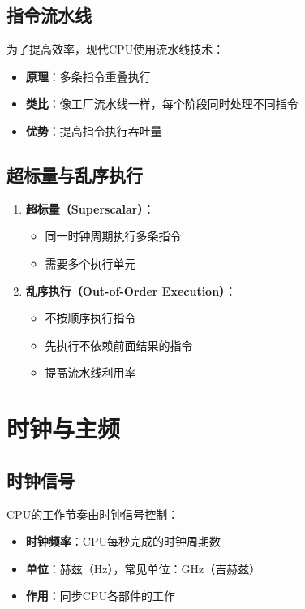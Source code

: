 \documentclass[12pt,UTF8]{ctexbook}
\begin{document}
\section{指令流水线}

为了提高效率，现代CPU使用流水线技术：

\begin{itemize}[leftmargin=2em]
    \item \textbf{原理}：多条指令重叠执行
    \item \textbf{类比}：像工厂流水线一样，每个阶段同时处理不同指令
    \item \textbf{优势}：提高指令执行吞吐量
\end{itemize}

\section{超标量与乱序执行}

\begin{enumerate}
    \item \textbf{超标量（Superscalar）}：
    \begin{itemize}[leftmargin=2em]
        \item 同一时钟周期执行多条指令
        \item 需要多个执行单元
    \end{itemize}
    
    \item \textbf{乱序执行（Out-of-Order Execution）}：
    \begin{itemize}[leftmargin=2em]
        \item 不按顺序执行指令
        \item 先执行不依赖前面结果的指令
        \item 提高流水线利用率
    \end{itemize}
\end{enumerate}

\chapter{时钟与主频}

\section{时钟信号}

CPU的工作节奏由时钟信号控制：

\begin{itemize}[leftmargin=2em]
    \item \textbf{时钟频率}：CPU每秒完成的时钟周期数
    \item \textbf{单位}：赫兹（Hz），常见单位：GHz（吉赫兹）
    \item \textbf{作用}：同步CPU各部件的工作
\end{itemize}
\end{document}
